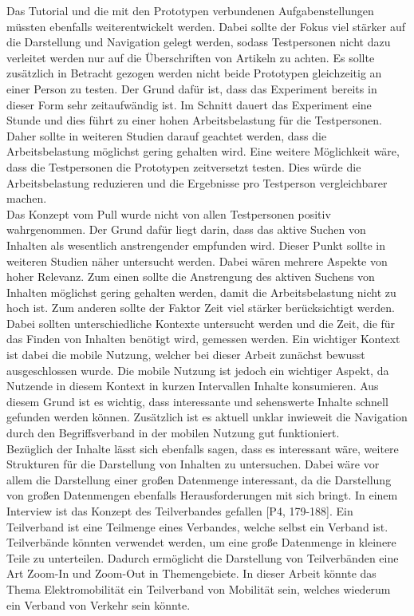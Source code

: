 Das Tutorial und die mit den Prototypen verbundenen Aufgabenstellungen müssten ebenfalls weiterentwickelt werden.
Dabei sollte der Fokus viel stärker auf die Darstellung und Navigation gelegt werden, sodass Testpersonen nicht dazu verleitet werden nur auf die Überschriften von Artikeln zu achten.
Es sollte zusätzlich in Betracht gezogen werden nicht beide Prototypen gleichzeitig an einer Person zu testen.
Der Grund dafür ist, dass das Experiment bereits in dieser Form sehr zeitaufwändig ist.
Im Schnitt dauert das Experiment eine Stunde und dies führt zu einer hohen Arbeitsbelastung für die Testpersonen.
Daher sollte in weiteren Studien darauf geachtet werden, dass die Arbeitsbelastung möglichst gering gehalten wird.
Eine weitere Möglichkeit wäre, dass die Testpersonen die Prototypen zeitversetzt testen.
Dies würde die Arbeitsbelastung reduzieren und die Ergebnisse pro Testperson vergleichbarer machen.\\

Das Konzept vom Pull wurde nicht von allen Testpersonen positiv wahrgenommen.
Der Grund dafür liegt darin, dass das aktive Suchen von Inhalten als wesentlich anstrengender empfunden wird.
Dieser Punkt sollte in weiteren Studien näher untersucht werden.
Dabei wären mehrere Aspekte von hoher Relevanz.
Zum einen sollte die Anstrengung des aktiven Suchens von Inhalten möglichst gering gehalten werden, damit die Arbeitsbelastung nicht zu hoch ist.
Zum anderen sollte der Faktor Zeit viel stärker berücksichtigt werden.
Dabei sollten unterschiedliche Kontexte untersucht werden und die Zeit, die für das Finden von Inhalten benötigt wird, gemessen werden.
Ein wichtiger Kontext ist dabei die mobile Nutzung, welcher bei dieser Arbeit zunächst bewusst ausgeschlossen wurde.
Die mobile Nutzung ist jedoch ein wichtiger Aspekt, da Nutzende in diesem Kontext in kurzen Intervallen Inhalte konsumieren.
Aus diesem Grund ist es wichtig, dass interessante und sehenswerte Inhalte schnell gefunden werden können.
Zusätzlich ist es aktuell unklar inwieweit die Navigation durch den Begriffsverband in der mobilen Nutzung gut funktioniert.\\

Bezüglich der Inhalte lässt sich ebenfalls sagen, dass es interessant wäre, weitere Strukturen für die Darstellung von Inhalten zu untersuchen.
Dabei wäre vor allem die Darstellung einer großen Datenmenge interessant, da die Darstellung von großen Datenmengen ebenfalls Herausforderungen mit sich bringt.
In einem Interview ist das Konzept des Teilverbandes gefallen [P4, 179-188].
Ein Teilverband ist eine Teilmenge eines Verbandes, welche selbst ein Verband ist.
Teilverbände könnten verwendet werden, um eine große Datenmenge in kleinere Teile zu unterteilen.
Dadurch ermöglicht die Darstellung von Teilverbänden eine Art Zoom-In und Zoom-Out in Themengebiete.
In dieser Arbeit könnte das Thema Elektromobilität ein Teilverband von Mobilität sein, welches wiederum ein Verband von Verkehr sein könnte. \\

